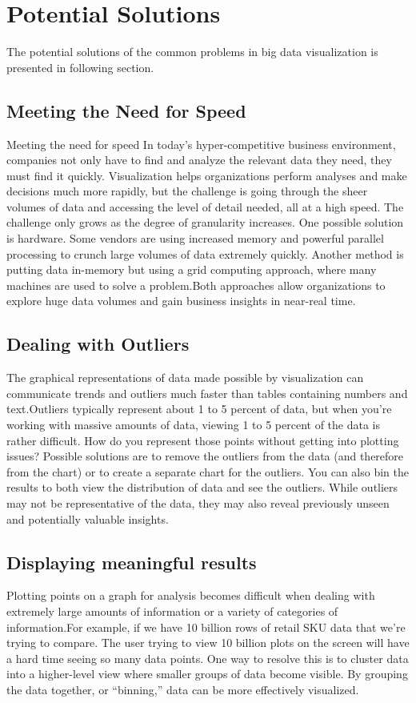 \section{Potential Solutions}
The potential solutions of the common problems in big data visualization is presented in following section.
\subsection{Meeting the Need for Speed}
Meeting the need for speed In today’s hyper-competitive business environment, companies not only have to find and analyze the relevant data they need, they must find it quickly. Visualization helps organizations perform analyses and make decisions much more rapidly, but the challenge is going through the sheer volumes of data and accessing the level of detail needed, all at a high speed. The challenge only grows as the degree of granularity increases. One possible solution is hardware. Some vendors are using increased memory and powerful parallel processing to crunch large volumes of data extremely quickly. Another method is putting data in-memory but using a grid computing approach, where many machines are used to solve a problem.Both approaches allow organizations to explore huge data volumes and gain business insights in near-real time.
\subsection{Dealing with Outliers}
The graphical representations of data made possible by visualization can communicate trends and outliers much faster than tables containing numbers and text.Outliers typically represent about 1 to 5 percent of data, but when you’re working with massive amounts of data, viewing 1 to 5 percent of the data is rather difficult. How do you represent those points without getting into plotting issues? Possible solutions are to remove the outliers from the data (and therefore from the chart) or to create a separate chart for the outliers. You can also bin the results to both view the distribution of data and see the outliers. While outliers may not be representative of the data, they may also reveal previously unseen and potentially valuable insights.
\subsection{Displaying meaningful results}
Plotting points on a graph for analysis becomes difficult when dealing with extremely large amounts of information or a variety of categories of information.For example, if we have 10 billion rows of retail SKU data that we’re trying to compare. The user trying to view 10 billion plots on the screen will have a hard time seeing so many data points. One way to resolve this is to cluster data into a higher-level view where smaller groups of data become visible. By grouping the data together, or “binning,” data can be more effectively visualized.
